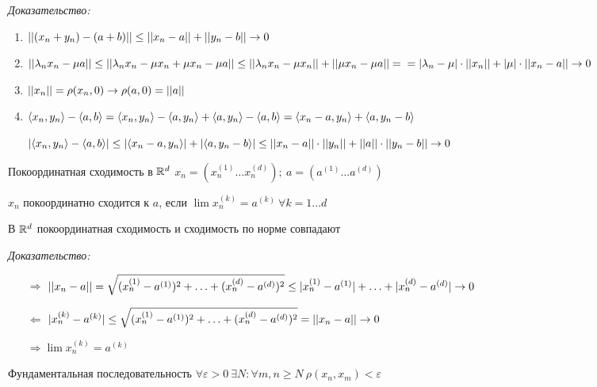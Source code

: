 \documentclass[12pt]{article}
\begin{document}
\textit{Доказательство:}

\begin{enumerate}
    \item $|| (x_n + y_n) - (a + b) || \leq || x_n - a || + || y_n - b || \to 0$
    \item $|| \lambda_n x_n - \mu a || \leq || \lambda_n x_n - \mu x_n + \mu x_n - \mu a || \leq || \lambda_nx_n - \mu x_n || + || \mu x_n - \mu a || = \\
    = |\lambda_n - \mu| \cdot || x_n || + |\mu| \cdot || x_n - a || \to 0$
    \item $|| x_n || = \rho(x_n, 0) \to \rho(a, 0) = || a ||$
    \item $\langle x_n, y_n \rangle - \langle a, b \rangle = \langle x_n, y_n \rangle - \langle a, y_n \rangle + \langle a, y_n \rangle - \langle a, b \rangle = \langle x_n - a, y_n \rangle + \langle a, y_n - b \rangle$
    
    $|\langle x_n, y_n \rangle - \langle a, b \rangle| \leq |\langle x_n - a, y_n \rangle| + |\langle a, y_n - b \rangle| \leq || x_n - a || \cdot || y_n || + || a || \cdot || y_n - b || \to 0$
\end{enumerate}

\begin{defin}{Покоординатная сходимость в $\mathbb R^d$}
    $x_n = (x_n^{(1)} \ldots x_n^{(d)});\ a = (a^{(1)} \ldots a^{(d)})$

    $x_n$ покоординатно сходится к $a$, если $\lim x_n^{(k)} = a^{(k)}\ \forall k = 1 \ldots d$
\end{defin}

\begin{theo}{}
    В $\mathbb R^d$ покоординатная сходимость и сходимость по норме совпадают
\end{theo}

\textit{Доказательство:}

\begin{itemize}
    \item[$\Rightarrow$] $|| x_n - a || = \sqrt{(x_n^{(1)} - a^{(1)})^2 + \ldots + (x_n^{(d)} - a^{(d)})^2} \leq |x_n^{(1)} - a^{(1)}| + \ldots + |x_n^{(d)} - a^{(d)}| \to 0$
    
    \item[$\Leftarrow$] $|x_n^{(k)} - a^{(k)}| \leq \sqrt{(x_n^{(1)} - a^{(1)})^2 + \ldots + (x_n^{(d)} - a^{(d)})^2} = || x_n - a || \to 0$
    
    $\Rightarrow \lim x_n^{(k)} = a^{(k)}$
\end{itemize}

\begin{defin}{Фундаментальная последовательность}
    $\forall \varepsilon > 0\ \exists N : \forall m, n \geq N\ \rho(x_n, x_m) < \varepsilon$
\end{defin}
\end{document}

